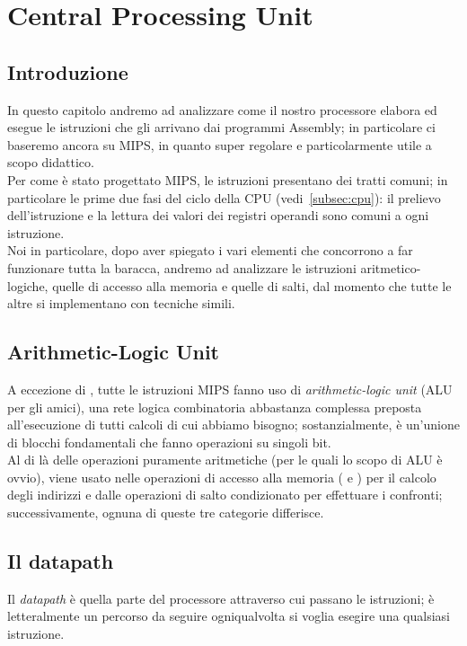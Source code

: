 \documentclass[class=book, crop=false, oneside]{standalone}
\begin{document}
\chapter{Central Processing Unit}

\section{Introduzione}
In questo capitolo andremo ad analizzare come il nostro processore elabora ed esegue le istruzioni che gli arrivano dai programmi Assembly; in particolare ci baseremo ancora su MIPS, in quanto super regolare e particolarmente utile a scopo didattico.\\
Per come è stato progettato MIPS, le istruzioni presentano dei tratti comuni; in particolare le prime due fasi del ciclo della CPU (vedi~\ref{subsec:cpu}): il prelievo dell'istruzione e la lettura dei valori dei registri operandi sono comuni a ogni istruzione.\\
Noi in particolare, dopo aver spiegato i vari elementi che concorrono a far funzionare tutta la baracca, andremo ad analizzare le istruzioni aritmetico-logiche, quelle di accesso alla memoria e quelle di salti, dal momento che tutte le altre si implementano con tecniche simili.

\section{Arithmetic-Logic Unit}
A eccezione di , tutte le istruzioni MIPS fanno uso di \emph{arithmetic-logic unit} (ALU per gli amici), una rete logica combinatoria abbastanza complessa preposta all'esecuzione di tutti calcoli di cui abbiamo bisogno; sostanzialmente, è un’unione di blocchi fondamentali che fanno operazioni su singoli bit.\\
Al di là delle operazioni puramente aritmetiche (per le quali lo scopo di ALU è ovvio), viene usato nelle operazioni di accesso alla memoria ( e ) per il calcolo degli indirizzi e dalle operazioni di salto condizionato per effettuare i confronti; successivamente, ognuna di queste tre categorie differisce.

\section{Il datapath}
Il \emph{datapath} è quella parte del processore attraverso cui passano le istruzioni; è letteralmente un percorso da seguire ogniqualvolta si voglia esegire una qualsiasi istruzione.
\end{document}
